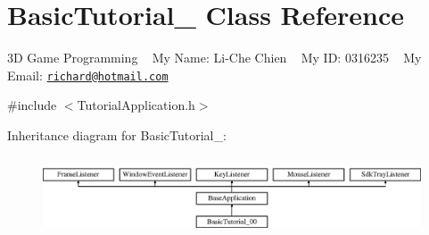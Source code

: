 \hypertarget{class_basic_tutorial__00}{}\section{Basic\+Tutorial\+\_ Class Reference}
\label{class_basic_tutorial__00}


3D Game Programming ~\newline
My Name\+: Li-\/\+Che Chien ~\newline
My ID\+: 0316235 ~\newline
My Email\+: \href{mailto:richard@hotmail.com}{\tt richard@hotmail.\+com}  




{\ttfamily \#include $<$Tutorial\+Application.\+h$>$}

Inheritance diagram for Basic\+Tutorial\+\_\+:\begin{figure}[H]
\begin{center}
\leavevmode
\includegraphics[height=2.382979cm]{class_basic_tutorial__00}
\end{center}
\end{figure}

